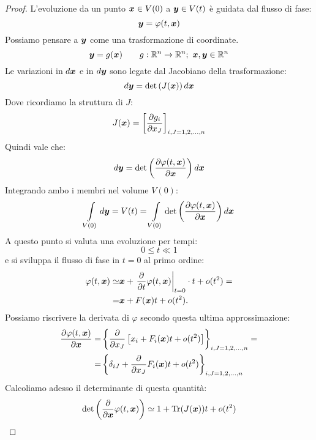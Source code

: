 \begin{proof}
    L'evoluzione da un punto $\boldsymbol{x}  \in V(0)$ a $\boldsymbol{y}\in V(t)$ è guidata dal flusso di fase:
    \[
	\boldsymbol{y}  = \varphi (t, \boldsymbol{x})
    \] 
    Possiamo pensare a $\boldsymbol{y}$ come una trasformazione di coordinate. 
    \[
	\boldsymbol{y}  = g(\boldsymbol{x}) \qquad g:\mathbb{R}^n\to \mathbb{R}^n; \ \boldsymbol{x}, \boldsymbol{y}  \in \mathbb{R}^n
    \] 
    Le variazioni in $d\boldsymbol{x}$ e in $d\boldsymbol{y}$ sono legate dal Jacobiano della trasformazione:
    \[
	d\boldsymbol{y}  = \text{det} \left(J(\boldsymbol{x})\right)d\boldsymbol{x}
    \] 
    Dove ricordiamo la struttura di $J$:
    \[
	J(\boldsymbol{x}) = \left[\frac{\partial g_i}{\partial x_J} \right]_{i, J = 1,2,\ldots, n}
    \] 
    Quindi vale che:
    \[
	d\boldsymbol{y}  = \text{det} \left(\frac{\partial \varphi (t,\boldsymbol{x})}{\partial \boldsymbol{x}} \right)d\boldsymbol{x}
    \] 
    Integrando ambo i membri nel volume $V(0)$:
    \[
	\int\limits_{V(0)} d\boldsymbol{y} = V(t) = 
	\int\limits_{V(0)} \text{det}\left(\frac{\partial \varphi (t,\boldsymbol{x})}{\partial \boldsymbol{x}} \right)d\boldsymbol{x}
    \] 
    A questo punto si valuta una evoluzione per tempi:
    \[
        0 \le t \ll 1
    \] 
    e si sviluppa il flusso di fase in $t = 0$  al primo ordine:
    \[\begin{aligned}
	\varphi (t, \boldsymbol{x}) \simeq & \boldsymbol{x}  + \left.\frac{\partial }{\partial t} \varphi (t, \boldsymbol{x})\right|_{t=0}\cdot t + o(t^2) = \\
	    =& \boldsymbol{x} + F(\boldsymbol{x})t + o(t^2)
    .\end{aligned}\]
    Possiamo riscrivere la derivata di $\varphi$  secondo questa ultima approssimazione:
    \[\begin{aligned}
	\frac{\partial \varphi (t, \boldsymbol{x})}{\partial \boldsymbol{x}} = &
	\left\{\frac{\partial }{\partial x_J} \left[x_i + F_i(\boldsymbol{x}) t + o(t^2)\right]\right\}_{i, J = 1, 2, \ldots, n} = \\
	=& \left\{ \delta_{iJ} +\frac{\partial }{\partial x_J}  F_i(\boldsymbol{x}) t + o(t^2)\right\}_{i, J = 1, 2, \ldots, n} 
    \end{aligned}\]
    Calcoliamo adesso il determinante di questa quantità:
    \begin{equation}
	\text{det}\left(\frac{\partial }{\partial \boldsymbol{x}} \varphi (t, \boldsymbol{x})\right) \simeq
	1 + \text{Tr}(J(\boldsymbol{x}))t + o(t^2)
	\label{eq:9_2}
    \end{equation}

\end{proof}
